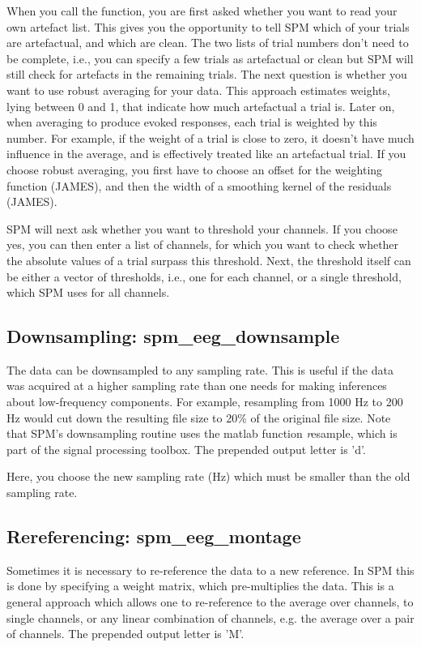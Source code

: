When you call the function, you are first asked whether you want to read your own artefact list. This gives you the opportunity to tell SPM which of your trials are artefactual, and which are clean. The two lists of trial numbers don't need to be complete, i.e., you can specify a few trials as artefactual or clean but SPM will still check for artefacts in the remaining trials. The next question is whether you want to use robust averaging for your data. This approach estimates weights, lying between 0 and 1, that indicate how much artefactual a trial is. Later on, when averaging to produce evoked responses, each trial is weighted by this number. For example, if the weight of a trial is close to zero, it doesn't have much influence in the average, and is effectively treated like an artefactual trial. If you choose robust averaging, you first have to choose an offset for the weighting function (JAMES), and then the width of a smoothing kernel of the residuals (JAMES).

SPM will next ask whether you want to threshold your channels. If you choose yes, you can then enter a list of channels, for which you want to check whether the absolute values of a trial surpass this threshold. Next, the threshold itself can be either a vector of thresholds, i.e., one for each channel, or a single threshold, which SPM uses for all channels.


\subsection{Downsampling: spm\_eeg\_downsample}
The data can be downsampled to any sampling rate. This is useful if
the data was acquired at a higher sampling rate than one needs for 
making inferences about low-frequency components. For example,
resampling from 1000 Hz to 200 Hz would cut down the resulting file
size to 20\% of the original file size. Note that SPM's downsampling
routine uses the matlab function {\textit resample}, which is part of
the signal processing toolbox. The prepended output letter is 'd'.

Here, you choose the new sampling rate (Hz) which must be smaller than the old sampling rate.

\subsection{Rereferencing: spm\_eeg\_montage}
Sometimes it is necessary to re-reference the data to a new
reference. In SPM this is done by specifying a weight matrix, which 
pre-multiplies the data. This is a general approach which 
allows one to re-reference to the average over channels, to single
channels, or any linear combination of channels, e.g. the average over
a pair of channels. The prepended output letter is 'M'.

